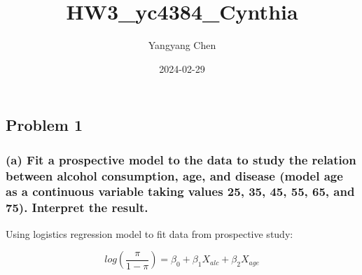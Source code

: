\documentclass[
]{article}
\title{HW3\_yc4384\_Cynthia}
\author{Yangyang Chen}
\date{2024-02-29}
\begin{document}
\maketitle

\hypertarget{problem-1}{%
\subsection{Problem 1}\label{problem-1}}

\hypertarget{a-fit-a-prospective-model-to-the-data-to-study-the-relation-between-alcohol-consumption-age-and-disease-model-age-as-a-continuous-variable-taking-values-25-35-45-55-65-and-75.-interpret-the-result.}{%
\subsubsection{(a) Fit a prospective model to the data to study the
relation between alcohol consumption, age, and disease (model age as a
continuous variable taking values 25, 35, 45, 55, 65, and 75). Interpret
the
result.}\label{a-fit-a-prospective-model-to-the-data-to-study-the-relation-between-alcohol-consumption-age-and-disease-model-age-as-a-continuous-variable-taking-values-25-35-45-55-65-and-75.-interpret-the-result.}}

Using logistics regression model to fit data from prospective study:

\[log(\frac{\pi}{1-\pi}) = \beta_0 +\beta_1X_{alc}+\beta_2X_{age}\]
\end{document}
